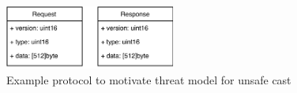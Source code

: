 \begin{figure}[htp!]
    \centering
    \includegraphics[width=0.5\textwidth]{assets/figures/chapter3/information-leak-threat-model-protocol.pdf}
    \caption{Example protocol to motivate threat model for unsafe cast}
    \label{fig:information-leak-threat-model-protocol}
\end{figure}
